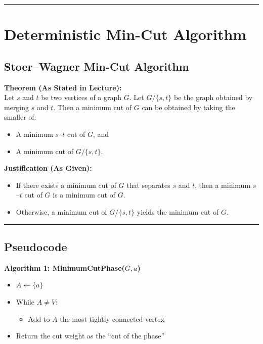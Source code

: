 \documentclass[12pt]{article}
\begin{document}
\hrule
\vspace{1em}

\section{Deterministic Min-Cut Algorithm}

\subsection{Stoer–Wagner Min-Cut Algorithm}

\textbf{Theorem (As Stated in Lecture):} \\
Let \( s \) and \( t \) be two vertices of a graph \( G \). Let \( G/\{s, t\} \) be the graph obtained by merging \( s \) and \( t \). Then a minimum cut of \( G \) can be obtained by taking the smaller of:
\begin{itemize}
    \item A minimum \( s \)--\( t \) cut of \( G \), and
    \item A minimum cut of \( G/\{s, t\} \).
\end{itemize}

\textbf{Justification (As Given):}
\begin{itemize}
    \item If there exists a minimum cut of \( G \) that separates \( s \) and \( t \), then a minimum \( s \)--\( t \) cut of \( G \) is a minimum cut of \( G \).
    \item Otherwise, a minimum cut of \( G/\{s, t\} \) yields the minimum cut of \( G \).
\end{itemize}

\hrule
\vspace{1em}

\subsection{Pseudocode}

\textbf{Algorithm 1: MinimumCutPhase(\( G, a \))}

\begin{itemize}
    \item \( A \leftarrow \{a\} \)
    \item While \( A \neq V \):
    \begin{itemize}
        \item Add to \( A \) the most tightly connected vertex
    \end{itemize}
    \item Return the cut weight as the ``cut of the phase''
\end{itemize}
\end{document}
